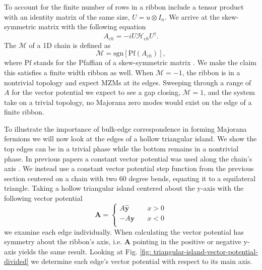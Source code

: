 \documentclass[aps,prb,showpacs,amsmath,amssymb,superscriptaddress]{revtex4-2}
\let\oldhat\hat
\renewcommand{\hat}[1]{\oldhat{\mathbf{#1}}}
\renewcommand{\vec}[1]{\mathbf{#1}}
\newcommand{\ham}{\mathcal{H}}
\begin{document}
To account for the finite number of rows in a ribbon include a tensor product with an identity matrix of the same size, $U = u \otimes I_n$.
We arrive at the skew-symmetric matrix with the following equation
\begin{equation}
  A_{ch} = -i U \ham_{ch} U^{\dagger}.
\end{equation}
The $\mathcal{M}$ of a 1D chain is defined as
\begin{equation}
  \mathcal{M} = \text{sgn}[\text{Pf}(A_{ch})],
\end{equation}
where $\text{Pf}$ stands for the Pfaffian of a skew-symmetric matrix \cite{kitaevUnpairedMajoranaFermions2001}.
We make the claim this satisfies a finite width ribbon as well.
When $\mathcal{M} = -1$, the ribbon is in a nontrivial topology and expect MZMs at its edges.
Sweeping through a range of $A$ for the vector potential we expect to see a gap closing, $\mathcal{M} = 1$, and the system take on a trivial topology, no Majorana zero modes would exist on the edge of a finite ribbon.

To illustrate the importance of bulk-edge correspondence in forming Majorana fermions we will now look at the edges of a hollow triangular island.
We show the top edges can be in a trivial phase while the bottom remains in a nontrivial phase.
In previous papers a constant vector potential was used along the chain's axis \cite{romitoManipulatingMajoranaFermions2012, takasanSupercurrentinducedTopologicalPhase2022}.
We instead use a constant vector potential step function from the previous section centered on a chain with two 60 degree bends, equating it to a equilateral triangle.
Taking a hollow triangular island centered about the y-axis with the following vector potential
\begin{equation}
  \vec{A} = \begin{cases}
            A \hat{y} \quad &x > 0 \\
            -A \hat{y} \quad &x < 0 \\
            \end{cases}
\end{equation}
we examine each edge individually.
When calculating  the vector potential has symmetry about the ribbon's axis, i.e. $\vec{A}$ pointing in the positive or negative y-axis yields the same result.
Looking at Fig. \ref{fig: triangular-island-vector-potential-divided} we determine each edge's vector potential with respect to its main axis.
\end{document}
